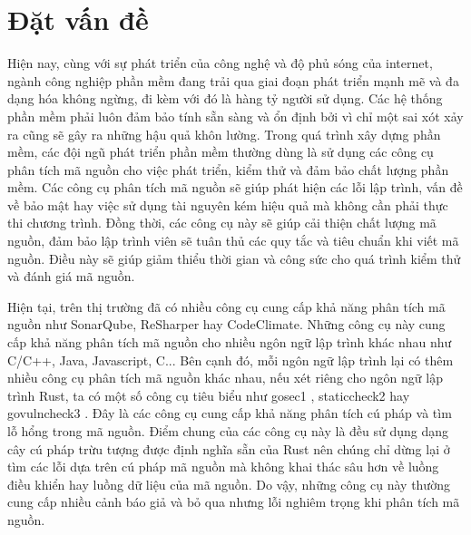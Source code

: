 \chapter{Đặt vấn đề}
\label{chap:introduction}

Hiện nay, cùng với sự phát triển của công nghệ và độ phủ sóng của internet, ngành
công nghiệp phần mềm đang trải qua giai đoạn phát triển mạnh mẽ và đa dạng hóa không
ngừng, đi kèm với đó là hàng tỷ người sử dụng. Các hệ thống phần mềm phải luôn đảm
bảo tính sẵn sàng và ổn định bởi vì chỉ một sai xót xảy ra cũng sẽ gây ra những hậu
quả khôn lường. Trong quá trình xây dựng phần mềm, các đội ngũ phát triển phần mềm
thường dùng là sử dụng các công cụ phân tích mã nguồn cho việc
phát triển, kiểm thử và đảm bảo chất lượng phần mềm. Các công cụ phân tích mã nguồn
sẽ giúp phát hiện các lỗi lập trình, vấn đề về bảo mật hay việc sử dụng tài nguyên kém
hiệu quả mà không cần phải thực thi chương trình. Đồng thời, các công cụ này sẽ giúp
cải thiện chất lượng mã nguồn, đảm bảo lập trình viên sẽ tuân thủ các quy tắc và tiêu
chuẩn khi viết mã nguồn. Điều này sẽ giúp giảm thiểu thời gian và công sức cho quá
trình kiểm thử và đánh giá mã nguồn.

Hiện tại, trên thị trường đã có nhiều công cụ cung cấp khả năng phân tích mã nguồn
như SonarQube, ReSharper hay CodeClimate. Những công cụ này cung cấp khả năng
phân tích mã nguồn cho nhiều ngôn ngữ lập trình khác nhau như C/C++, Java, Javascript,
C... Bên cạnh đó, mỗi ngôn ngữ lập trình lại có thêm nhiều công cụ phân tích mã nguồn
khác nhau, nếu xét riêng cho ngôn ngữ lập trình Rust, ta có một số công cụ tiêu biểu như
gosec1 , staticcheck2 hay govulncheck3 . Đây là các công cụ cung cấp khả năng phân tích
cú pháp và tìm lỗ hổng trong mã nguồn. Điểm chung của các công cụ này là đều sử dụng dạng cây cú pháp trừu tượng được định nghĩa sẵn của Rust nên chúng chỉ dừng lại ở tìm
các lỗi dựa trên cú pháp mã nguồn mà không khai thác sâu hơn về luồng điều khiển hay
luồng dữ liệu của mã nguồn. Do vậy, những công cụ này thường cung cấp nhiều cảnh
báo giả và bỏ qua nhưng lỗi nghiêm trọng khi phân tích mã nguồn.

